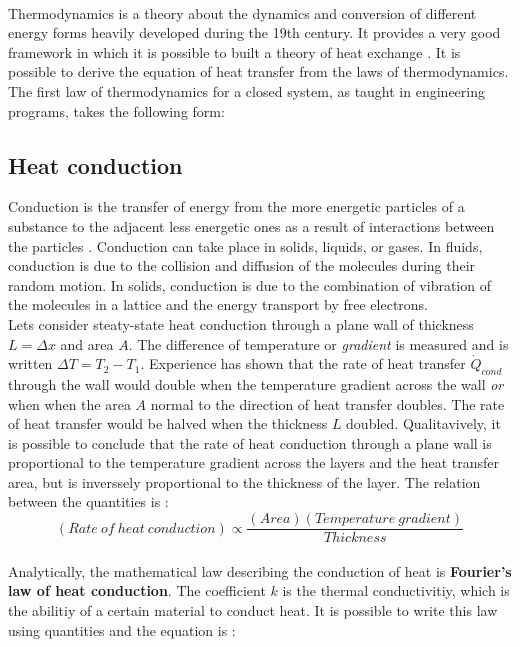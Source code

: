 \\
\break
\normalsize{\indent Thermodynamics is a theory about the dynamics and conversion of different energy forms heavily developed during the 19th century. It provides a very good framework in which it is possible to built a theory of heat exchange \cites{ahtt6e}. It is possible to derive the equation of heat transfer from the laws of thermodynamics. The first law of thermodynamics for a closed system, as taught in engineering programs, takes the following form:}

\subsection{Heat conduction}
\normalsize{Conduction is the transfer of energy from the more energetic particles of a substance to the adjacent less energetic ones as a result of interactions between the particles \cites{cengel2004heat}. Conduction can take place in solids, liquids, or gases. In fluids, conduction is due to the collision and diffusion of the molecules during their random motion. In solids, conduction is due to the combination of vibration of the molecules in a lattice and the energy transport by free electrons.}
\\
\break
\normalsize{\indent Lets consider steaty-state heat conduction through a plane wall of thickness $L  = \Delta x$ and area $A$. The difference of temperature or {\it gradient} is measured and is written $\Delta T = T_2 - T_1$. Experience has shown that the rate of heat transfer $\dot{Q}_{cond}$ through the wall would double when the temperature gradient across the wall {\it or} when when the area $A$ normal to the direction of heat transfer doubles. The rate of heat transfer would be halved when the thickness $L$ doubled. Qualitavively, it is possible to conclude that the rate of heat conduction through a plane wall is proportional to the temperature gradient across the layers and the heat transfer area, but is inverssely proportional to the thickness of the layer. The relation between the quantities is :}
\\
\begin{equation}
    (Rate \ of \ heat \ conduction) \propto \frac{(Area)(Temperature \ gradient)}{Thickness}
    \label{eqn:CondEq}
\end{equation}
\\
\normalsize{\indent Analytically, the mathematical law describing the conduction of heat is {\bfseries Fourier's law of heat conduction}. The coefficient $k$ is the thermal conductivitiy, which is the abilitiy of a certain material to conduct heat. It is possible to write this law using quantities and the equation is :}
